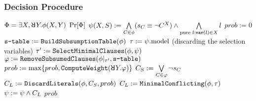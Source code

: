 \begin{frame}
    \frametitle{Decision Procedure}
    {\footnotesize
        \begin{algorithmic}[1]
            \REQUIRE $\Qf=\exists X,\random{} Y.\pf(X,Y)$
            \ENSURE $\Pr[\Phi]$
            \STATE $\psi(X,S) := \bigwedge\limits_{C\in\phi}(s_{C}\equiv\lnot C^X)\land\bigwedge\limits_{\text{pure }l: \texttt{var}(l)\in X}l$\label{code:erssat-init-select}
            \STATE $prob := 0$
            \STATE $\texttt{s-table} := \texttt{BuildSubsumptionTable}(\phi)$\label{code:erssat-subsume-table}
            \WHILE{($\sat{\select}$)}
            \STATE $\tau := \psi.\mathrm{model}$ (discarding the selection variables)
            \IF{($\sat{\pcf{\pf}{\as}}$)}
            \STATE $\tau' := \texttt{SelectMinimalClauses}(\phi,\psi)$\label{code:erssat-minimal-clauses}
            \STATE $\varphi := \texttt{RemoveSubsumedClauses}(\phi|_{\tau'},\texttt{s-table})$\label{code:erssat-subsume-clauses}
            \STATE $prob := \max\{prob,\texttt{ComputeWeight}(\random{} Y.\varphi)\}$\label{code:erssat-wmc}
            \STATE $C_S := \bigvee\limits_{C\in\varphi}\lnot s_{C}$
            \STATE $C_L := \texttt{DiscardLiterals}(\phi,C_S,prob)$\label{code:erssat-discard-literals}
            \ELSE
            \STATE $C_L := \texttt{MinimalConflicting}(\phi,\tau)$
            \ENDIF
            \STATE $\psi := \psi \land C_L$
            \ENDWHILE
            \RETURN $prob$
        \end{algorithmic}
    }
\end{frame}